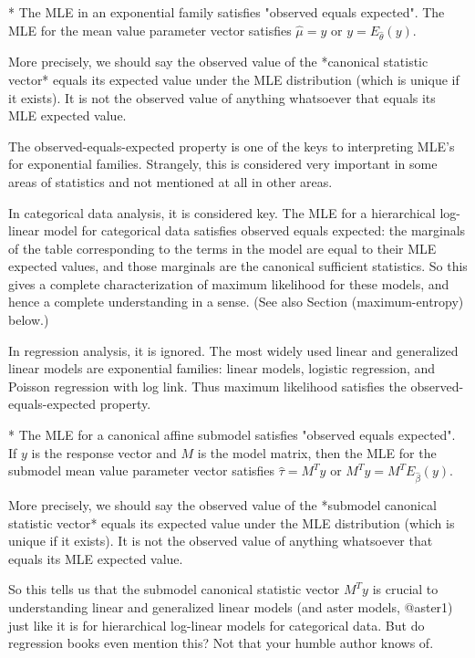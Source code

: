 \documentclass[11pt]{article}
\begin{document}
 * The MLE in an exponential family satisfies "observed equals expected".
   The MLE for the mean value parameter vector satisfies $\hat{\mu} = y$ or
   $y = E_{\hat{\theta}}(y)$.

More precisely, we should say the observed value of the *canonical statistic
vector* equals its expected value under the MLE distribution (which is unique
if it exists).  It is not the observed value of anything whatsoever that equals
its MLE expected value.

The observed-equals-expected property is one of the keys to interpreting
MLE's for exponential families.  Strangely, this is considered very important
in some areas of statistics and not mentioned at all in other areas.

In categorical data analysis, it is considered key.  The MLE for a
hierarchical log-linear model for categorical data satisfies observed
equals expected: the marginals of the table corresponding to the terms in the
model are equal to their MLE expected values, and those marginals are the
canonical sufficient statistics.  So this gives a complete characterization
of maximum likelihood for these models, and hence a complete understanding
in a sense.
(See also Section \@ref(maximum-entropy) below.)

In regression analysis, it is ignored.  The most widely used linear and
generalized linear models are exponential families: linear models,
logistic regression, and Poisson regression with log link.  Thus maximum
likelihood satisfies the observed-equals-expected property.

 * The MLE for a canonical affine submodel satisfies
   "observed equals expected".  If $y$ is the response vector and $M$ is the
   model matrix, then the MLE for the submodel mean value parameter vector
   satisfies $\hat{\tau} = M^T y$ or $M^T y = M^T E_{\hat{\beta}}(y)$.

More precisely, we should say the observed value of
the *submodel canonical statistic vector* equals its expected value under
the MLE distribution (which is unique if it exists).
It is not the observed value of anything whatsoever that equals
its MLE expected value.

So this tells us that the submodel canonical statistic vector $M^T y$
is crucial to understanding linear and generalized linear models
(and aster models, @aster1)
just like it is for hierarchical log-linear models for categorical data.
But do regression books even mention this?  Not that your humble author
knows of.
\end{document}
